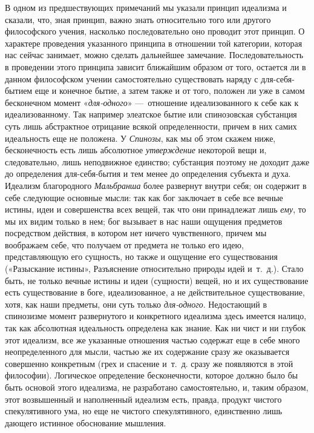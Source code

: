 В одном из предшествующих примечаний мы указали принцип идеализма и сказали,
что, зная принцип, важно знать относительно того или другого философского
учения, насколько последовательно оно проводит этот принцип. О характере
проведения указанного принципа в отношении той категории, которая нас
сейчас занимает, можно сделать дальнейшее замечание. Последовательность в
проведении этого принципа зависит ближайшим образом от того, остается ли в
данном философском учении самостоятельно существовать наряду с
для-себя-бытием еще и конечное бытие, а затем также и от того, положен ли
уже в самом бесконечном момент «{\em для-одного}»
—~отношение идеализованного к себе как к идеализованному. Так например
элеатское бытие или спинозовская субстанция суть лишь абстрактное отрицание
всякой определенности, причем в них самих идеальность еще не положена. У
{\em Спинозы}, как мы об этом скажем ниже,
бесконечность есть лишь абсолютное {\em утверждение}
некоторой вещи и, следовательно, лишь неподвижное единство; субстанция
поэтому не доходит даже до определения для-себя-бытия и тем менее до
определения субъекта и духа. Идеализм благородного
{\em Мальбранша} более развернут внутри себя; он
содержит в себе следующие основные мысли: так как бог заключает в себе все
вечные истины, идеи и совершенства всех вещей, так что они принадлежат лишь
{\em ему}, то мы их видим только в нем; бог вызывает в
нас наши ощущения предметов посредством действия, в котором нет ничего
чувственного, причем мы воображаем себе, что получаем от предмета не только
его идею, представляющую его сущность, но также и ощущение его
существования («Разыскание истины», Разъяснение относительно природы идей
и~т.~д.). Стало быть, не только вечные истины и идеи (сущности) вещей, но и
их существование есть существование в боге, идеализованное, а не
действительное существование, хотя, как наши предметы, они суть только
{\em для-одного}. Недостающий в спинозизме момент
развернутого и конкретного идеализма здесь имеется налицо, так как
абсолютная идеальность определена как знание. Как ни чист и ни глубок этот
идеализм, все же указанные отношения частью содержат еще в себе много
неопределенного для мысли, частью же их содержание сразу же оказывается
совершенно конкретным (грех и спасение и~т.~д. сразу же появляются в этой
философии). Логическое определение бесконечности, которое должно было бы
быть основой этого идеализма, не разработано самостоятельно, и, таким
образом, этот возвышенный и наполненный идеализм есть, правда, продукт
чистого спекулятивного ума, но еще не чистого спекулятивного, единственно
лишь дающего истинное обоснование мышления.

